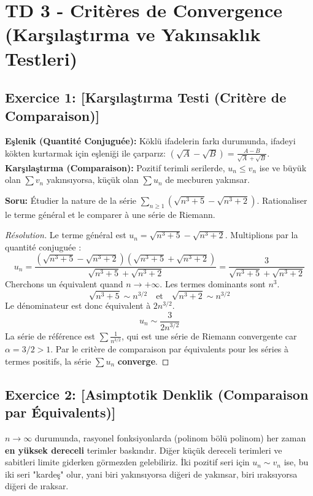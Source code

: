 \documentclass[12pt,a4paper]{report}
\begin{document}
\section{TD 3 - Critères de Convergence (Karşılaştırma ve Yakınsaklık Testleri)}

\subsection*{Exercice 1: [Karşılaştırma Testi (Critère de Comparaison)]}

\begin{tcolorbox}[colback=blue!5!white,colframe=blue!75!black,title=Hatırlatma (Rappel): Eşlenik ile Çarpma ve Karşılaştırma]
\textbf{Eşlenik (Quantité Conjuguée):} Köklü ifadelerin farkı durumunda, ifadeyi kökten kurtarmak için eşleniği ile çarparız: $(\sqrt{A} - \sqrt{B}) = \frac{A - B}{\sqrt{A} + \sqrt{B}}$.
\textbf{Karşılaştırma (Comparaison):} Pozitif terimli serilerde, $u_n \le v_n$ ise ve büyük olan $\sum v_n$ yakınsıyorsa, küçük olan $\sum u_n$ de mecburen yakınsar.
\end{tcolorbox}

\textbf{Soru:}
Étudier la nature de la série $\sum_{n \ge 1} \left( \sqrt{n^3+5} - \sqrt{n^3+2} \right)$. Rationaliser le terme général et le comparer à une série de Riemann.

\begin{proof}[Résolution]
Le terme général est $u_n = \sqrt{n^3+5} - \sqrt{n^3+2}$. Multiplions par la quantité conjuguée :
\[ u_n = \frac{(\sqrt{n^3+5} - \sqrt{n^3+2})(\sqrt{n^3+5} + \sqrt{n^3+2})}{\sqrt{n^3+5} + \sqrt{n^3+2}} = \frac{3}{\sqrt{n^3+5} + \sqrt{n^3+2}} \]
Cherchons un équivalent quand $n \to +\infty$. Les termes dominants sont $n^3$.
\[ \sqrt{n^3+5} \sim n^{3/2} \quad \text{et} \quad \sqrt{n^3+2} \sim n^{3/2} \]
Le dénominateur est donc équivalent à $2n^{3/2}$.
\[ u_n \sim \frac{3}{2n^{3/2}} \]
La série de référence est $\sum \frac{1}{n^{3/2}}$, qui est une série de Riemann convergente car $\alpha = 3/2 > 1$.
Par le critère de comparaison par équivalents pour les séries à termes positifs, la série $\sum u_n$ \textbf{converge}.
\end{proof}

\subsection*{Exercice 2: [Asimptotik Denklik (Comparaison par Équivalents)]}

\begin{tcolorbox}[colback=purple!5!white,colframe=purple!75!black,title=Hatırlatma (Rappel): Polinomlarda Denklik]
$n \to \infty$ durumunda, rasyonel fonksiyonlarda (polinom bölü polinom) her zaman \textbf{en yüksek dereceli} terimler baskındır. Diğer küçük dereceli terimleri ve sabitleri limite giderken görmezden gelebiliriz. 
İki pozitif seri için $u_n \sim v_n$ ise, bu iki seri "kardeş" olur, yani biri yakınsıyorsa diğeri de yakınsar, biri ıraksıyorsa diğeri de ıraksar.
\end{tcolorbox}
\end{document}
